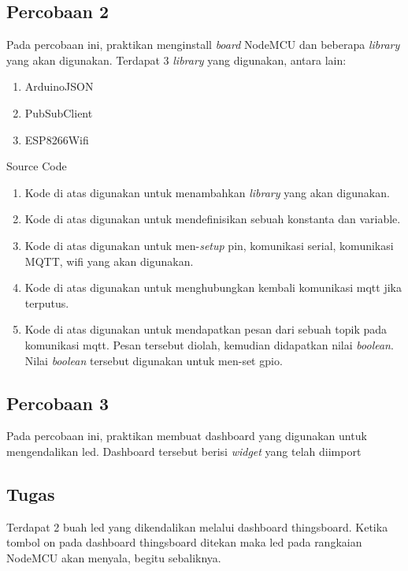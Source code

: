 \documentclass{class}
\begin{document}
    \subsection{Percobaan 2}
    Pada percobaan ini, praktikan menginstall \emph{board} NodeMCU dan beberapa \emph{library} yang akan digunakan.
    Terdapat 3 \emph{library} yang digunakan, antara lain:
    \begin{enumerate}
      \item ArduinoJSON
      \item PubSubClient
      \item ESP8266Wifi
    \end{enumerate}
    Source Code
    \begin{enumerate}
      \item 
      Kode di atas digunakan untuk menambahkan \emph{library} yang akan digunakan. \\
      \item 
      Kode di atas digunakan untuk mendefinisikan sebuah konstanta dan variable. \\
      \item 
      Kode di atas digunakan untuk men-\emph{setup} pin, komunikasi serial, komunikasi MQTT, wifi yang akan digunakan. \\
      \item 
      Kode di atas digunakan untuk menghubungkan kembali komunikasi mqtt jika terputus.
      \item 
      Kode di atas digunakan untuk mendapatkan pesan dari sebuah topik pada komunikasi mqtt. 
      Pesan tersebut diolah, kemudian didapatkan nilai \emph{boolean}.
      Nilai \emph{boolean} tersebut digunakan untuk men-set gpio. \\
    \end{enumerate}
    
    \subsection{Percobaan 3}
    Pada percobaan ini, praktikan membuat dashboard yang digunakan untuk mengendalikan led.
    Dashboard tersebut berisi \emph{widget} yang telah diimport

    \subsection{Tugas}
    Terdapat 2 buah led yang dikendalikan melalui dashboard thingsboard. 
    Ketika tombol on pada dashboard thingsboard ditekan maka led pada rangkaian NodeMCU akan menyala, begitu sebaliknya.
    
\end{document}
